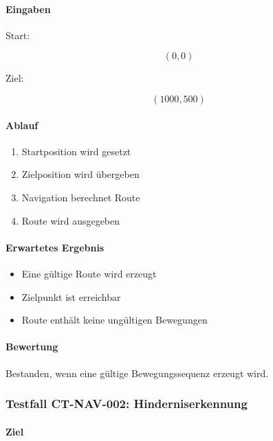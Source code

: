 \documentclass[
  a4paper,
  12pt,
  DIV=12,        %
  parskip=half,  %
  headings=small %
]{scrartcl}
\theoremstyle{definition}
\providecommand{\tightlist}{%
  \setlength{\itemsep}{0pt}\setlength{\parskip}{0pt}}
\theoremstyle{definition}
\begin{document}
\paragraph{Eingaben}\label{eingaben-2}

Start:

\[
(0,0)
\]

Ziel:

\[
(1000,500)
\]

\paragraph{Ablauf}\label{ablauf-2}

\begin{enumerate}
\def\labelenumi{\arabic{enumi}.}
\tightlist
\item
  Startposition wird gesetzt
\item
  Zielposition wird übergeben
\item
  Navigation berechnet Route
\item
  Route wird ausgegeben
\end{enumerate}

\paragraph{Erwartetes Ergebnis}\label{erwartetes-ergebnis-2}

\begin{itemize}
\tightlist
\item
  Eine gültige Route wird erzeugt
\item
  Zielpunkt ist erreichbar
\item
  Route enthält keine ungültigen Bewegungen
\end{itemize}

\paragraph{Bewertung}\label{bewertung-2}

Bestanden, wenn eine gültige Bewegungssequenz erzeugt wird.

\subsubsection{Testfall CT-NAV-002:
Hinderniserkennung}\label{testfall-ct-nav-002-hinderniserkennung}

\paragraph{Ziel}\label{ziel-3}
\end{document}
